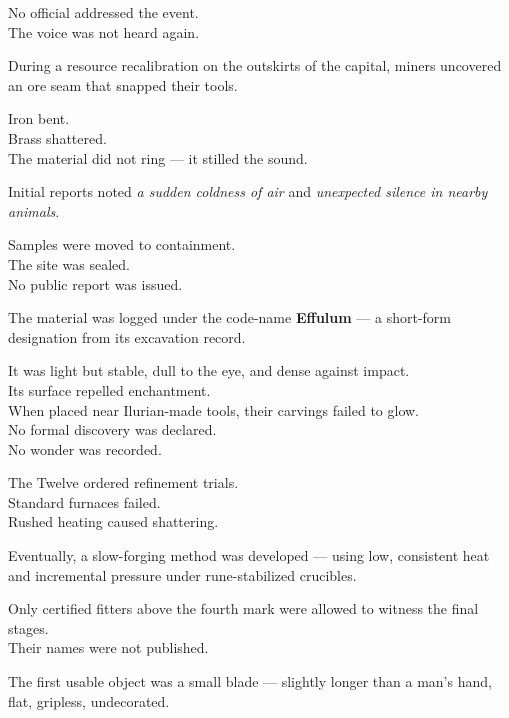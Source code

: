 \documentclass[12pt]{article}
\begin{document}
No official addressed the event.\\
The voice was not heard again.

\vspace{1em}

During a resource recalibration on the outskirts of the capital, miners uncovered an ore seam that snapped their tools.

Iron bent.\\
Brass shattered.\\
The material did not ring — it stilled the sound.

Initial reports noted \textit{a sudden coldness of air} and \textit{unexpected silence in nearby animals}.

Samples were moved to containment.\\
The site was sealed.\\
No public report was issued.

\vspace{1em}

The material was logged under the code-name \textbf{Effulum} — a short-form designation from its excavation record.

It was light but stable, dull to the eye, and dense against impact.\\
Its surface repelled enchantment.\\
When placed near Ilurian-made tools, their carvings failed to glow.\\

No formal discovery was declared.\\
No wonder was recorded.

\vspace{1em}

The Twelve ordered refinement trials.\\
Standard furnaces failed.\\
Rushed heating caused shattering.

Eventually, a slow-forging method was developed — using low, consistent heat and incremental pressure under rune-stabilized crucibles.

Only certified fitters above the fourth mark were allowed to witness the final stages.\\
Their names were not published.

\vspace{1em}

The first usable object was a small blade — slightly longer than a man’s hand, flat, gripless, undecorated.
\end{document}
